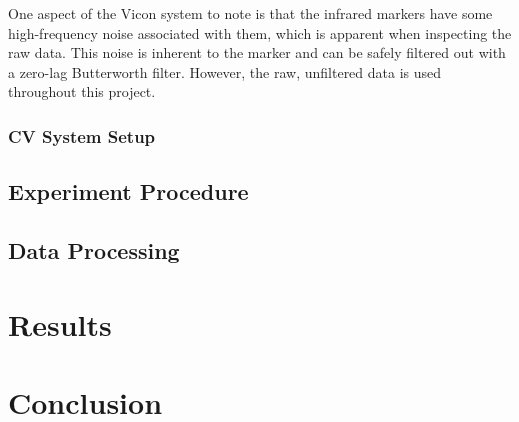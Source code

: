 One aspect of the Vicon system to note is that the infrared markers have some high-frequency noise associated with them, which is apparent when inspecting the raw data. This noise is inherent to the marker and can be safely filtered out with a zero-lag Butterworth filter. However, the raw, unfiltered data is used throughout this project. 

\subsubsection{CV System Setup}

\subsection{Experiment Procedure}

\subsection{Data Processing}

\section{Results}

\section{Conclusion}

